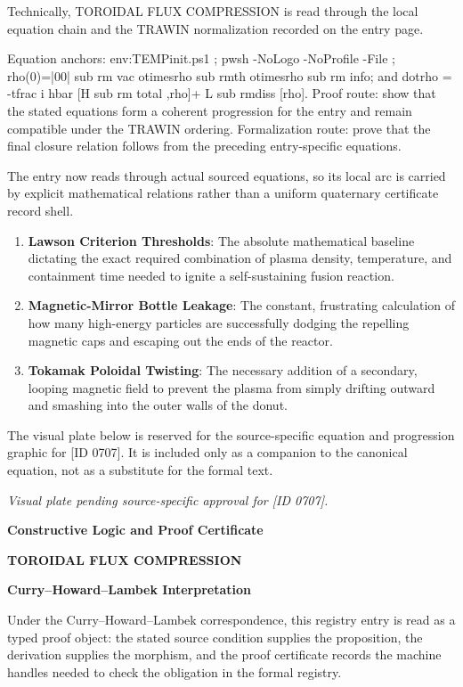 Technically, TOROIDAL FLUX COMPRESSION is read through the local equation chain and the TRAWIN normalization recorded on the entry page.

Equation anchors: env:TEMPinit.ps1 ; pwsh -NoLogo -NoProfile -File ; rho(0)=|00| sub rm vac otimesrho sub rmth otimesrho sub rm info; and dotrho = -tfrac i hbar [H sub rm total ,rho]+ L sub rmdiss [rho]. Proof route: show that the stated equations form a coherent progression for the entry and remain compatible under the TRAWIN ordering. Formalization route: prove that the final closure relation follows from the preceding entry-specific equations.

The entry now reads through actual sourced equations, so its local arc is carried by explicit mathematical relations rather than a uniform quaternary certificate record shell.
\endgroup

\begin{enumerate}[leftmargin=1.6em,itemsep=6pt,topsep=4pt]
\item \textbf{Lawson Criterion Thresholds}: The absolute mathematical baseline dictating the exact required combination of plasma density, temperature, and containment time needed to ignite a self-sustaining fusion reaction.
\item \textbf{Magnetic-Mirror Bottle Leakage}: The constant, frustrating calculation of how many high-energy particles are successfully dodging the repelling magnetic caps and escaping out the ends of the reactor.
\item \textbf{Tokamak Poloidal Twisting}: The necessary addition of a secondary, looping magnetic field to prevent the plasma from simply drifting outward and smashing into the outer walls of the donut.
\end{enumerate}

\begingroup\footnotesize\sloppy
The visual plate below is reserved for the source-specific equation and progression graphic for [ID 0707]. It is included only as a companion to the canonical equation, not as a substitute for the formal text.
\par\endgroup
\begingroup\footnotesize\itshape
Visual plate pending source-specific approval for [ID 0707].
\par\endgroup

\clearpage
\begingroup\tzpsupportsetup
\noindent\textbf{\fontsize{10.8pt}{12.8pt}\selectfont [ID 0707] Constructive Logic and Proof Certificate}\par
\noindent\textbf{\fontsize{10pt}{12pt}\selectfont TOROIDAL FLUX COMPRESSION}\par
\vspace{0.45em}
\begingroup
\footnotesize
\setlength{\parskip}{0.22em}
\setlength{\parindent}{0pt}
\noindent\textbf{Curry--Howard--Lambek Interpretation}\par
Under the Curry--Howard--Lambek correspondence, this registry entry is read as a typed proof
object: the stated source condition supplies the proposition, the derivation supplies the
morphism, and the proof certificate records the machine handles needed to check the obligation
in the formal registry.

